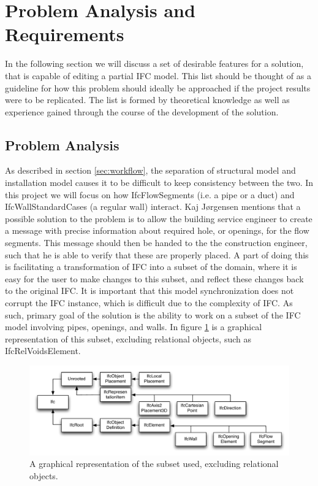 \section{Problem Analysis and Requirements}
In the following section we will discuss a set of desirable features for a solution, that is capable of editing a partial IFC model. This list should be thought of as a guideline for how this problem should ideally be approached if the project results were to be replicated. The list is formed by theoretical knowledge as well as experience gained through the course of the development of the solution. %

\subsection{Problem Analysis}
\label{problem_analysis}
As described in section \ref{sec:workflow}, the separation of structural model and installation model causes it to be difficult to keep consistency between the two. In this project we will focus on how IfcFlowSegments (i.e. a pipe or a duct) and IfcWallStandardCases (a regular wall) interact. Kaj Jørgensen mentions that a possible solution to the problem is to allow the building service engineer to create a message with precise information about required hole, or openings, for the flow segments. This message should then be handed to the the construction engineer, such that he is able to verify that these are properly placed. A part of doing this is facilitating a transformation of IFC into a subset of the domain, where it is easy for the user to make changes to this subset, and reflect these changes back to the original IFC. It is important that this model synchronization does not corrupt the IFC instance, which is difficult due to the complexity of IFC. As such, primary goal of the solution is the ability to work on a subset of the IFC model involving pipes, openings, and walls. In figure \ref{fig:ifcheirachy} is a graphical representation of this subset, excluding relational objects, such as IfcRelVoidsElement.

\begin{figure}[htbp]
    \centering
        \includegraphics[width=120mm]{images/IfcHeirachy.pdf}
    \caption{A graphical representation of the subset used, excluding relational objects.}
    \label{fig:ifcheirachy}
\end{figure}

